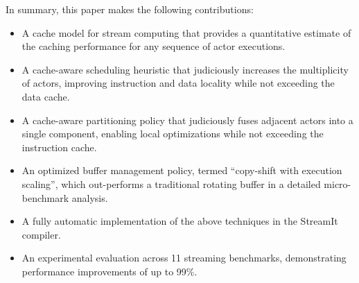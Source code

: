 In summary, this paper makes the following contributions:
\begin{itemize}

\item A cache model for stream computing that provides a quantitative
estimate of the caching performance for any sequence of actor
executions.

\item A cache-aware scheduling heuristic that judiciously increases
the multiplicity of actors, improving instruction and data locality
while not exceeding the data cache.

\item A cache-aware partitioning policy that judiciously fuses
adjacent actors into a single component, enabling local optimizations
while not exceeding the instruction cache.

\item An optimized buffer management policy, termed ``copy-shift with
execution scaling'', which out-performs a traditional rotating buffer
in a detailed micro-benchmark analysis.

\item A fully automatic implementation of the above techniques in the
StreamIt compiler.

\item An experimental evaluation across 11 streaming benchmarks,
demonstrating performance improvements of up to 99\%.
\end{itemize}




